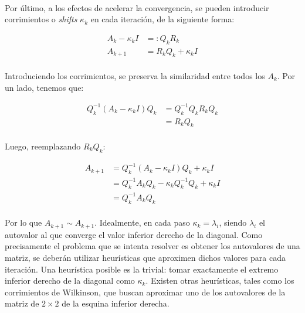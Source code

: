 \documentclass[12pt, twocolumn]{article}
\begin{document}
	\paragraph{} Por último, a los efectos de acelerar la convergencia, se pueden introducir corrimientos o \textit{shifts} $\kappa_{k}$ en cada iteración, de la siguiente forma:
	
	\begin{align}
		A_{k} - \kappa_{k}I &=: Q_{k}R_{k} \\
		A_{k+1} &= R_{k}Q_{k} + \kappa_{k}I 
	\end{align}
	
	\paragraph{} Introduciendo los corrimientos, se preserva la similaridad entre todos los $A_{k}$. Por un lado, tenemos que:
	
	\begin{align}
		Q_{k}^{-1}(A_{k} - \kappa_{k}I)Q_{k} &= Q_{k}^{-1}Q_{k}R_{k}Q_{k}  \\ &= R_{k}Q_{k}
	\end{align}
	
	\paragraph{} Luego, reemplazando $R_{k}Q_{k}$:
	
	\begin{align}
		A_{k+1} &= Q_{k}^{-1}(A_{k} - \kappa_{k}I)Q_{k} + \kappa_{k}I \\ &= Q_{k}^{-1}A_{k}Q_{k} - \kappa_{k}Q_{k}^{-1}Q_{k} + \kappa_{k}I  \\ &= Q_{k}^{-1}A_{k}Q_{k}  
	\end{align}
	
	\paragraph{} Por lo que $A_{k+1} \sim A_{k+1}$. Idealmente, en cada paso $\kappa_{k} = \lambda_{i}$, siendo $\lambda_{i}$ el autovalor al que converge el valor inferior derecho de la diagonal. Como precisamente el problema que se intenta resolver es obtener los autovalores de una matriz, se deberán utilizar heurísticas que aproximen dichos valores para cada iteración. Una heurística posible es la trivial: tomar exactamente el extremo inferior derecho de la diagonal como $\kappa_{k}$. Existen otras heurísticas, tales como los corrimientos de Wilkinson, que buscan aproximar uno de los autovalores de la matriz de $2\times2$ de la esquina inferior derecha.
	
\end{document}
